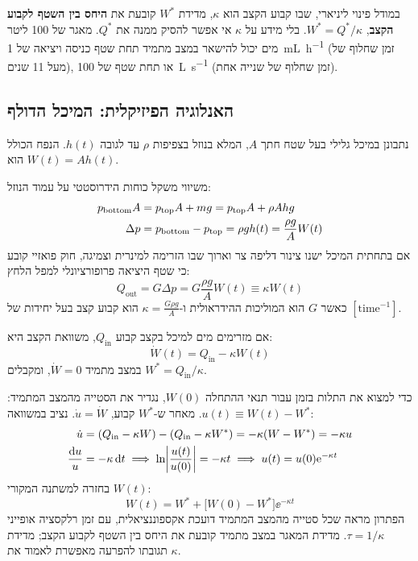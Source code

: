 \begin{remark}
במודל פינוי ליניארי, שבו קבוע הקצב הוא $\kappa$, מדידת $W^*$ קובעת את \textbf{היחס בין השטף לקבוע הקצב}, $W^* = Q^*/\kappa$. בלי מידע על $\kappa$ אי אפשר להסיק ממנה את $Q^*$. מאגר של 100 ליטר מים יכול להישאר במצב מתמיד תחת שטף כניסה ויציאה של \SI{1}{\milli\liter\per\hour} (זמן שחלוף של מעל 11 שנים), או תחת שטף של \SI{100}{\liter\per\second} (זמן שחלוף של שנייה אחת).
\end{remark}

\subsection{האנלוגיה הפיזיקלית: המיכל הדולף}\label{sec:leaky-bucket}
נתבונן במיכל גלילי בעל שטח חתך $A$, המלא בנוזל בצפיפות $\rho$ עד לגובה $h(t)$. הנפח הכולל הוא $W(t) = A h(t)$. 

משיווי משקל כוחות הידרוסטטי על עמוד הנוזל:
\begin{align}
p_{\mathrm{bottom}} A &= p_{\mathrm{top}} A + m g = p_{\mathrm{top}} A + \rho A h g \notag\\
\Delta p &= p_{\mathrm{bottom}} - p_{\mathrm{top}} = \rho g h(t) = \frac{\rho g}{A} W(t) \label{eq:hydrostatic}
\end{align}
אם בתחתית המיכל ישנו צינור דליפה צר וארוך שבו הזרימה למינרית וצמיגה, חוק פואזיי קובע כי שטף היציאה פרופורציונלי למפל הלחץ:
\begin{equation}\label{eq:poiseuille}
Q_{\mathrm{out}} = G \Delta p = G \frac{\rho g}{A} W(t) \equiv \kappa W(t)
\end{equation}
כאשר $G$ הוא המוליכות ההידראולית ו-$\kappa = \frac{G \rho g}{A}$ הוא קבוע קצב בעל יחידות של $[\text{time}^{-1}]$.

אם מזרימים מים למיכל בקצב קבוע $Q_{\mathrm{in}}$, משוואת הקצב היא:
\begin{equation}\label{eq:bucket-ode}
\dot{W}(t) = Q_{\mathrm{in}} - \kappa W(t)
\end{equation}
במצב מתמיד $\dot{W}=0$, ומקבלים $W^* = Q_{\mathrm{in}}/\kappa$. 

כדי למצוא את התלות בזמן עבור תנאי ההתחלה $W(0)$, נגדיר את הסטייה מהמצב המתמיד: $u(t) \equiv W(t) - W^*$. מאחר ש-$W^*$ קבוע, $\dot{u} = \dot{W}$. נציב במשוואה:
\begin{align}
\dot{u} &= (Q_{\mathrm{in}} - \kappa W) - (Q_{\mathrm{in}} - \kappa W^*) = -\kappa (W - W^*) = -\kappa u \notag\\
\frac{\dd u}{u} &= -\kappa\,\dd t \implies \ln\abs*{\frac{u(t)}{u(0)}} = -\kappa t \implies u(t) = u(0)\ee^{-\kappa t} \label{eq:bucket-solution}
\end{align}
בחזרה למשתנה המקורי $W(t)$:
\begin{equation}\label{eq:bucket-relaxation}
\boxed{W(t) = W^* + \bigl[W(0) - W^*\bigr]\ee^{-\kappa t}}
\end{equation}
הפתרון מראה שכל סטייה מהמצב המתמיד דועכת אקספוננציאלית, עם זמן רלקסציה אופייני $\tau = 1/\kappa$. מדידת המאגר במצב מתמיד קובעת את היחס בין השטף לקבוע הקצב; מדידת תגובתו להפרעה מאפשרת לאמוד את $\kappa$.

